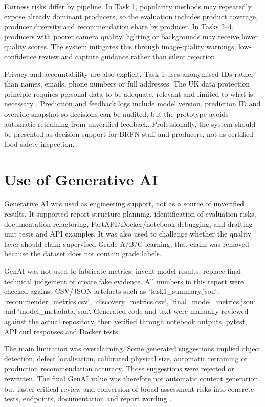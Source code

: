 \documentclass[11pt,a4paper]{article}
\begin{document}
Fairness risks differ by pipeline. In Task 1, popularity methods may repeatedly expose already dominant producers, so the evaluation includes product coverage, producer diversity and recommendation share by producer. In Tasks 2--4, producers with poorer camera quality, lighting or backgrounds may receive lower quality scores. The system mitigates this through image-quality warnings, low-confidence review and capture guidance rather than silent rejection.

Privacy and accountability are also explicit. Task 1 uses anonymised IDs rather than names, emails, phone numbers or full addresses. The UK data protection principle requires personal data to be adequate, relevant and limited to what is necessary \citep{govukdataprotection2026}. Prediction and feedback logs include model version, prediction ID and override snapshot so decisions can be audited, but the prototype avoids automatic retraining from unverified feedback. Professionally, the system should be presented as decision support for BRFN staff and producers, not as certified food-safety inspection.

\section{Use of Generative AI}
Generative AI was used as engineering support, not as a source of unverified results. It supported report structure planning, identification of evaluation risks, documentation refactoring, FastAPI/Docker/notebook debugging, and drafting unit tests and API examples. It was also used to challenge whether the quality layer should claim supervised Grade A/B/C learning; that claim was removed because the dataset does not contain grade labels.

GenAI was not used to fabricate metrics, invent model results, replace final technical judgement or create fake evidence. All numbers in this report were checked against CSV/JSON artefacts such as `task1\_summary.json`, `recommender\_metrics.csv`, `discovery\_metrics.csv`, `final\_model\_metrics.json` and `model\_metadata.json`. Generated code and text were manually reviewed against the actual repository, then verified through notebook outputs, pytest, API curl responses and Docker tests.

The main limitation was overclaiming. Some generated suggestions implied object detection, defect localisation, calibrated physical size, automatic retraining or production recommendation accuracy. Those suggestions were rejected or rewritten. The final GenAI value was therefore not automatic content generation, but faster critical review and conversion of broad assessment risks into concrete tests, endpoints, documentation and report wording \citep{uwe_ai_spec_2026}.
\end{document}
